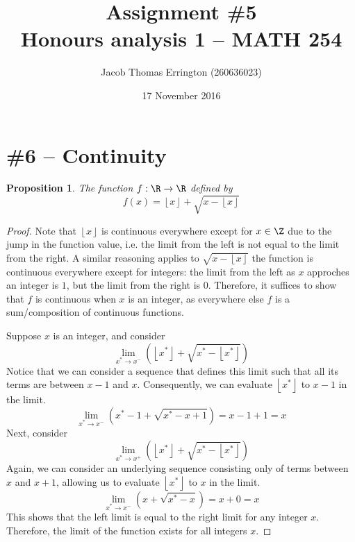 \documentclass[letterpaper,11pt]{article}
\author{Jacob Thomas Errington (260636023)}
\title{Assignment \#5\\Honours analysis 1 -- MATH 254}
\date{17 November 2016}
\newcommand{\floor}[1]{\left\lfloor#1\right\rfloor}
\newcommand{\parens}[1]{\left(#1\right)}
\newtheorem{prop}{Proposition}
\begin{document}
\maketitle

\section*{\#6 -- Continuity}

\begin{prop}
    The function $f : \R \to \R$ defined by
    \begin{equation*}
        f(x) = \floor{x} + \sqrt{x - \floor{x}}
    \end{equation*}
\end{prop}

\begin{proof}
    Note that $\floor{x}$ is continuous everywhere except for $x \in \Z$ due to
    the jump in the function value, i.e. the limit from the left is not equal
    to the limit from the right.
    A similar reasoning applies to $\sqrt{x - \floor{x}}$ the function is
    continuous everywhere except for integers: the limit from the left as $x$
    approches an integer is $1$, but the limit from the right is $0$.
    Therefore, it suffices to show that $f$ is continuous when $x$ is an
    integer, as everywhere else $f$ is a sum/composition of continuous
    functions.

    Suppose $x$ is an integer, and consider
    \begin{equation*}
        \lim_{x^* \to x^-}\parens{\floor{x^*} + \sqrt{x^* - \floor{x^*}}}
    \end{equation*}
    Notice that we can consider a sequence that defines this limit such that
    all its terms are between $x - 1$ and $x$. Consequently, we can
    evaluate $\floor{x^*}$ to $x - 1$ in the limit.
    \begin{equation*}
        \lim_{x^* \to x^-}\parens{x^* - 1 + \sqrt{x^* - x + 1}}
        = x - 1 + 1
        = x
    \end{equation*}
    Next, consider
    \begin{equation*}
        \lim_{x^* \to x^+}\parens{\floor{x^*} + \sqrt{x^* - \floor{x^*}}}
    \end{equation*}
    Again, we can consider an underlying sequence consisting only of terms
    between $x$ and $x + 1$, allowing us to evaluate $\floor{x^*}$ to $x$ in
    the limit.
    \begin{equation*}
        \lim_{x^* \to x^-}\parens{x + \sqrt{x^* - x}}
        = x + 0
        = x
    \end{equation*}
    This shows that the left limit is equal to the right limit for any integer
    $x$. Therefore, the limit of the function exists for all integers $x$.


\end{proof}
\end{document}
